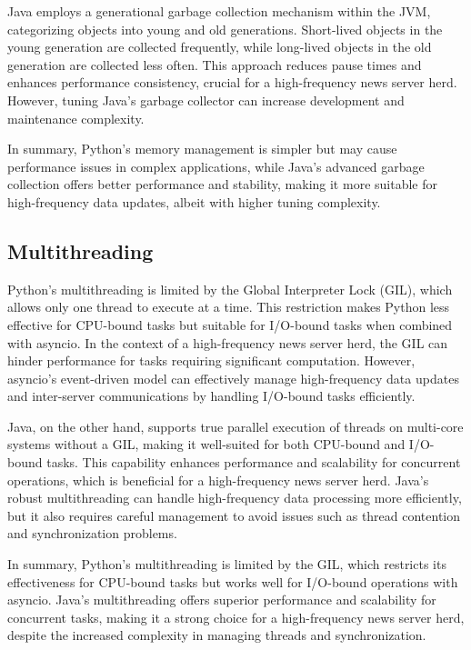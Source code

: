 \documentclass[letterpaper,twocolumn,10pt]{article}
\begin{document}
\noindent{}Java employs a generational garbage collection mechanism within the JVM, categorizing objects into young and old generations. Short-lived objects in the young generation are collected frequently, while long-lived objects in the old generation are collected less often. This approach reduces pause times and enhances performance consistency, crucial for a high-frequency news server herd. However, tuning Java's garbage collector can increase development and maintenance complexity.
\vspace{5pt}

\noindent{}In summary, Python’s memory management is simpler but may cause performance issues in complex applications, while Java’s advanced garbage collection offers better performance and stability, making it more suitable for high-frequency data updates, albeit with higher tuning complexity.

\subsection{Multithreading}
\noindent{}Python's multithreading is limited by the Global Interpreter Lock (GIL), which allows only one thread to execute at a time. This restriction makes Python less effective for CPU-bound tasks but suitable for I/O-bound tasks when combined with asyncio. In the context of a high-frequency news server herd, the GIL can hinder performance for tasks requiring significant computation. However, asyncio's event-driven model can effectively manage high-frequency data updates and inter-server communications by handling I/O-bound tasks efficiently.
\vspace{5pt}

\noindent{}Java, on the other hand, supports true parallel execution of threads on multi-core systems without a GIL, making it well-suited for both CPU-bound and I/O-bound tasks. This capability enhances performance and scalability for concurrent operations, which is beneficial for a high-frequency news server herd. Java’s robust multithreading can handle high-frequency data processing more efficiently, but it also requires careful management to avoid issues such as thread contention and synchronization problems.
\vspace{5pt}

\noindent{}In summary, Python's multithreading is limited by the GIL, which restricts its effectiveness for CPU-bound tasks but works well for I/O-bound operations with asyncio. Java's multithreading offers superior performance and scalability for concurrent tasks, making it a strong choice for a high-frequency news server herd, despite the increased complexity in managing threads and synchronization.
\end{document}
